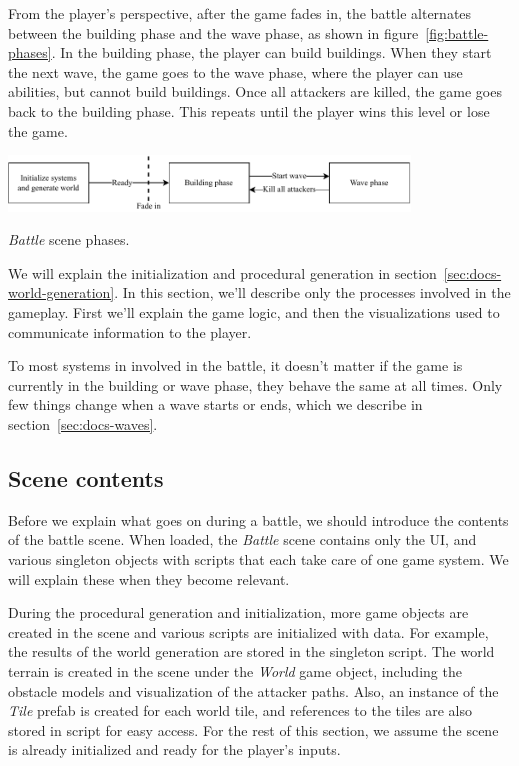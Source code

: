 From the player's perspective, after the game fades in, the battle alternates between the building phase and the wave phase, as shown in figure~\ref{fig:battle-phases}.
In the building phase, the player can build buildings.
When they start the next wave, the game goes to the wave phase, where the player can use abilities, but cannot build buildings.
Once all attackers are killed, the game goes back to the building phase.
This repeats until the player wins this level or lose the game.

\begin{center}
    \captionsetup{type=figure}
    \includegraphics[width=0.8\textwidth]{img/battle scene phases.pdf}
    \caption{\emph{Battle} scene phases.}
    \label{fig:battle-phases}
\end{center}

We will explain the initialization and procedural generation in section~\ref{sec:docs-world-generation}.
In this section, we'll describe only the processes involved in the gameplay.
First we'll explain the game logic, and then the visualizations used to communicate information to the player.

To most systems in involved in the battle, it doesn't matter if the game is currently in the building or wave phase, they behave the same at all times.
Only few things change when a wave starts or ends, which we describe in section~\ref{sec:docs-waves}.

\subsection{Scene contents}\label{sec:docs-battle-scene}

Before we explain what goes on during a battle, we should introduce the contents of the battle scene.
When loaded, the \emph{Battle} scene contains only the UI, and various singleton objects with scripts that each take care of one game system.
We will explain these when they become relevant.

During the procedural generation and initialization, more game objects are created in the scene and various scripts are initialized with data.
For example, the results of the world generation are stored in the  singleton script.
The world terrain is created in the scene under the \emph{World} game object, including the obstacle models and visualization of the attacker paths.
Also, an instance of the \emph{Tile} prefab is created for each world tile, and references to the tiles are also stored in  script for easy access.
For the rest of this section, we assume the scene is already initialized and ready for the player's inputs.

